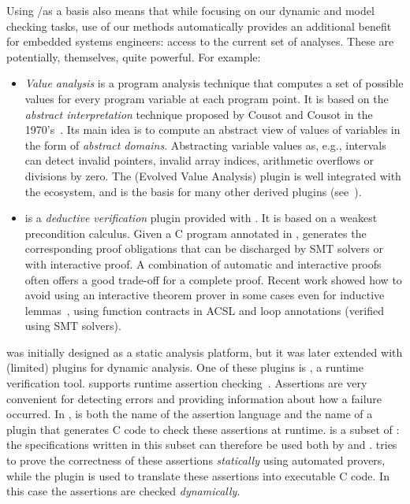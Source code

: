 Using \acsl/\framac as a basis also means that while focusing on our dynamic and model checking tasks, use of our methods automatically provides an additional benefit for embedded systems engineers: access to the current set of \framac analyses.  These are potentially, themselves, quite powerful.  For example:

\begin{itemize}
\item \emph{Value analysis} is a program analysis technique that computes a set of possible values for every program variable at each program point.
It is based on the \emph{abstract interpretation} technique proposed by Cousot and Cousot in the 1970's~\cite{cousot77}.
Its main idea is to compute an abstract view of values of variables in the form of \emph{abstract domains}.
Abstracting variable values as, e.g., intervals can detect invalid pointers, invalid array indices, arithmetic overflows or divisions by zero.
The \Eva (Evolved Value Analysis) plugin is well integrated with the \framac ecosystem, 
and is the basis for many other derived plugins (see~\cite{KKP2015:FAC}).

\item \Wp is a \emph{deductive verification} plugin provided with \framac.
It is based on a weakest precondition calculus.
Given a C program annotated in \acsl, \Wp generates the corresponding proof obligations that can be discharged by SMT solvers or with interactive proof.
A combination of automatic and interactive proofs often offers a good trade-off for a complete proof.
Recent work  showed how to avoid using an interactive theorem prover in some cases even for inductive lemmas~\cite{BLK2019:NFM}, using 
function contracts in ACSL and loop annotations (verified using SMT solvers).
\end{itemize}

\framac was initially designed as a static analysis platform, but it was later extended with (limited) plugins for dynamic analysis.
One of these plugins is \eacsl, a runtime verification tool.
\eacsl supports runtime assertion checking~\cite{CR2006:SEN}.
Assertions are very convenient for detecting errors and providing information about how a failure occurred.
In \framac, \eacsl is both the name of the assertion language and the name of a plugin that generates C code to check these assertions at runtime.
\eacsl is a subset of \acsl: the specifications written in this subset can therefore be used both by \Wp and \eacsl.
\Wp tries to prove the correctness of these assertions {\em statically} using automated provers, while the plugin \eacsl is used to translate these assertions into executable C code.
In this case the assertions are checked {\em dynamically}.

